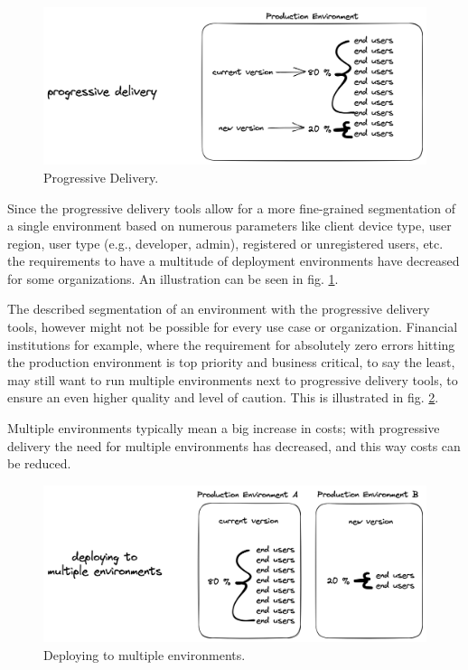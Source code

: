 \begin{figure}[h]
	\centering
	\includegraphics[width=1.00\linewidth]{assets/progressive-delivery.png}
	\caption{Progressive Delivery.
	}
	\label{fig:progressive-delivery}	
\end{figure}

Since the progressive delivery tools allow for a more
fine-grained segmentation
of a single environment based on numerous parameters like
client device type, user region, user type (e.g., developer, admin),
registered or unregistered users, etc.
the requirements to have a multitude of deployment environments
have decreased for some organizations.
An illustration can be seen in fig. \ref{fig:progressive-delivery}.

The described segmentation of an environment with the progressive delivery
tools, however might not be possible for every use case or organization.
Financial institutions for example, where the requirement for absolutely zero
errors hitting the production environment is top priority and business critical,
to say the least,
may still want to run multiple environments next to progressive delivery tools,
to ensure an even higher quality and level of caution.
This is illustrated in fig. \ref{fig:deploy-multiple-envs}.

Multiple environments typically mean a big increase in costs;
with progressive delivery the need for multiple environments has decreased,
and this way costs can be reduced.

\begin{figure}[h]
	\centering
	\includegraphics[width=1.00\linewidth]{assets/deploy-multiple-envs.png}
	\caption{Deploying to multiple environments.
	}
	\label{fig:deploy-multiple-envs}	
\end{figure}


